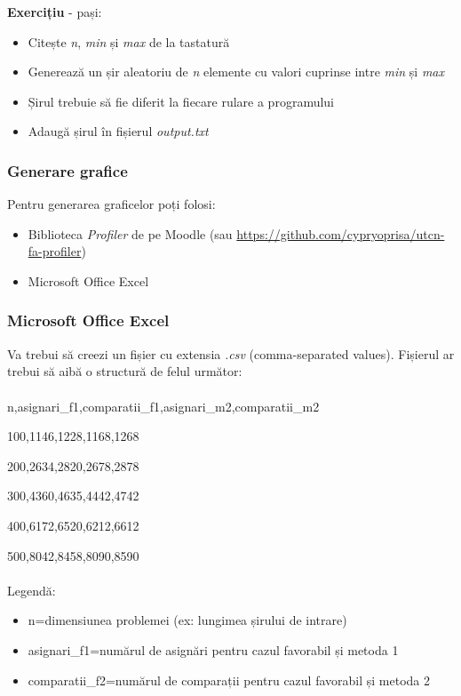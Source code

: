 \documentclass[../ro-fa-lab.tex]{subfiles}
\begin{document}
\textbf{Exercițiu} - pași:

\begin{itemize}
\item
  Citește \emph{n}, \emph{min} și \emph{max} de la tastatură
\item
  Generează un șir aleatoriu de \emph{n} elemente cu valori cuprinse
  intre \emph{min} și \emph{max}
\item
  Șirul trebuie să fie diferit la fiecare rulare a programului
\item
  Adaugă șirul în fișierul \emph{output.txt}
\end{itemize}

\subsubsection{Generare grafice}\label{generare-grafice}

Pentru generarea graficelor poți folosi:

\begin{itemize}
\item
  Biblioteca \emph{Profiler} de pe Moodle (sau
  \url{https://github.com/cypryoprisa/utcn-fa-profiler})
\end{itemize}

\begin{itemize}
\item
  Microsoft Office Excel
\end{itemize}

\subsubsection{Microsoft Office Excel}\label{microsoft-office-excel}

Va trebui să creezi un fișier cu extensia \emph{.csv} (comma-separated
values). Fișierul ar trebui să aibă o structură de felul următor:\\\\

n,asignari\_f1,comparatii\_f1,asignari\_m2,comparatii\_m2

100,1146,1228,1168,1268

200,2634,2820,2678,2878

300,4360,4635,4442,4742

400,6172,6520,6212,6612

500,8042,8458,8090,8590
\\\\
Legendă:

\begin{itemize}
\item
  n=dimensiunea problemei (ex: lungimea șirului de intrare)
\item
  asignari\_f1=numărul de asignări pentru cazul favorabil și metoda 1
\item
  comparatii\_f2=numărul de comparații pentru cazul favorabil și metoda
  2
\end{itemize}
\end{document}
